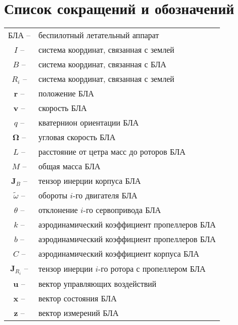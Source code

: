 \chapter*{Список сокращений и обозначений}

\begin{tabular}{cl}
	БЛА -- & беспилотный летательный аппарат\\
	$I$ -- &система координат, связанная с землей\\
	$B$ -- &система координат, связанная с БЛА\\
	$R_i$ -- &система координат, связанная с землей\\
	$\bm r$ -- &положение БЛА\\
	$\bm v$ -- &скорость БЛА\\
	$q$ -- &кватернион ориентации БЛА\\
	$\bm \Omega$ -- &угловая скорость БЛА\\
	$L$ -- &расстояние от цетра масс до роторов БЛА\\
	$M$ -- &общая масса БЛА\\
	$\bm J_B$ -- &тензор инерции корпуса БЛА\\
	$\tilde \omega$ -- &обороты $i$-го двигателя БЛА\\
	$\theta$ -- &отклонение $i$-го сервопривода БЛА\\
	$k$ -- &аэродинамический коэффициент пропеллеров БЛА\\
	$b$ -- &аэродинамический коэффициент пропеллеров БЛА\\
	$C$ -- &аэродинамический коэффициент корпуса БЛА\\
	$\bm J_{R_i}$ -- &тензор инерции $i$-го ротора с пропеллером БЛА\\
	$\bm u$ -- &вектор управляющих воздействий\\
	$\bm x$ -- &вектор состояния БЛА\\
	$\bm z$ -- &вектор измерений БЛА\\
\end{tabular}